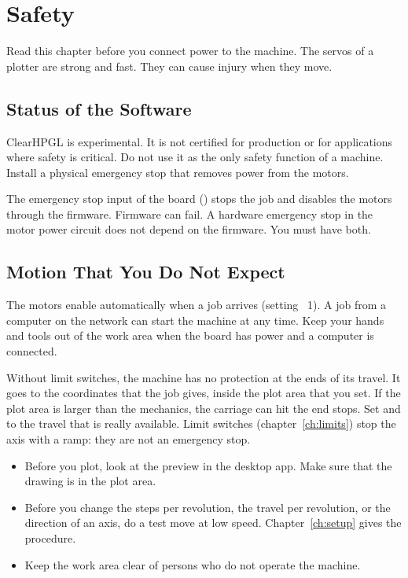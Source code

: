 \chapter{Safety}\label{ch:safety}

Read this chapter before you connect power to the machine. The servos of a
plotter are strong and fast. They can cause injury when they move.

\section{Status of the Software}

\begin{warning}
ClearHPGL is experimental. It is not certified for production or for
applications where safety is critical. Do not use it as the only safety
function of a machine. Install a physical emergency stop that removes power
from the motors.
\end{warning}

The emergency stop input of the board () stops the job and
disables the motors through the firmware. Firmware can fail. A hardware
emergency stop in the motor power circuit does not depend on the firmware.
You must have both.

\section{Motion That You Do Not Expect}

\begin{warning}
The motors enable automatically when a job arrives (setting
~1). A job from a computer on the network can start the
machine at any time. Keep your hands and tools out of the work area when the
board has power and a computer is connected.
\end{warning}

\begin{warning}
Without limit switches, the machine has no protection at the ends of its
travel. It goes to the coordinates that the job gives, inside the plot area
that you set. If the plot area is larger than the mechanics, the carriage can
hit the end stops. Set  and  to the travel that
is really available. Limit switches (chapter~\ref{ch:limits}) stop the axis
with a ramp: they are not an emergency stop.
\end{warning}

\begin{itemize}
  \item Before you plot, look at the preview in the desktop app. Make sure
        that the drawing is in the plot area.
  \item Before you change the steps per revolution, the travel per
        revolution, or the direction of an axis, do a test move at low
        speed. Chapter~\ref{ch:setup} gives the procedure.
  \item Keep the work area clear of persons who do not operate the machine.
\end{itemize}

